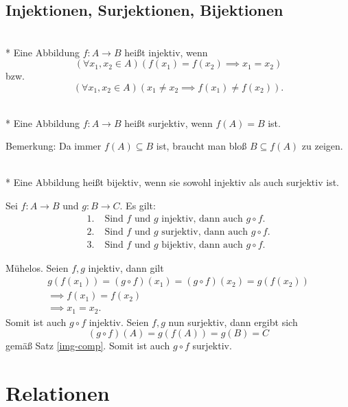 \newpage
\subsection{Injektionen, Surjektionen, Bijektionen}

\begin{Definition}\mbox{}\\*
Eine Abbildung $f\colon A\to B$ heißt injektiv, wenn
\[(\forall x_1,x_2\in A)(f(x_1)=f(x_2)\implies x_1=x_2)\]
bzw.
\[(\forall x_1,x_2\in A)(x_1\ne x_2\implies f(x_1)\ne f(x_2)).\]
\end{Definition}

\begin{Definition}\mbox{}\\*
Eine Abbildung $f\colon A\to B$ heißt surjektiv,
wenn $f(A)=B$ ist.
\end{Definition}
Bemerkung: Da immer $f(A)\subseteq B$ ist, braucht man bloß $B\subseteq f(A)$
zu zeigen.

\begin{Definition}\mbox{}\\*
Eine Abbildung heißt bijektiv, wenn sie sowohl injektiv als
auch surjektiv ist.
\end{Definition}

\begin{Satz}
Sei $f\colon A\to B$ und $g\colon B\to C$. Es gilt:
\begin{align*}
1.\; & \text{Sind $f$ und $g$ injektiv, dann auch $g\circ f$}.\\
2.\; & \text{Sind $f$ und $g$ surjektiv, dann auch $g\circ f$}.\\
3.\; & \text{Sind $f$ und $g$ bijektiv, dann auch $g\circ f$}.
\end{align*}
\end{Satz}
 Mühelos. Seien $f,g$ injektiv, dann gilt
\begin{gather*}
g(f(x_1)) = (g\circ f)(x_1) = (g\circ f)(x_2) = g(f(x_2))\\
\implies f(x_1) = f(x_2)\\
\implies x_1 = x_2.
\end{gather*}
Somit ist auch $g\circ f$ injektiv. Seien $f,g$ nun surjektiv,
dann ergibt sich
\[(g\circ f)(A) = g(f(A)) = g(B) = C\]
gemäß Satz \ref{img-comp}.
Somit ist auch $g\circ f$ surjektiv.\;\qedsymbol

\newpage
\section{Relationen}
